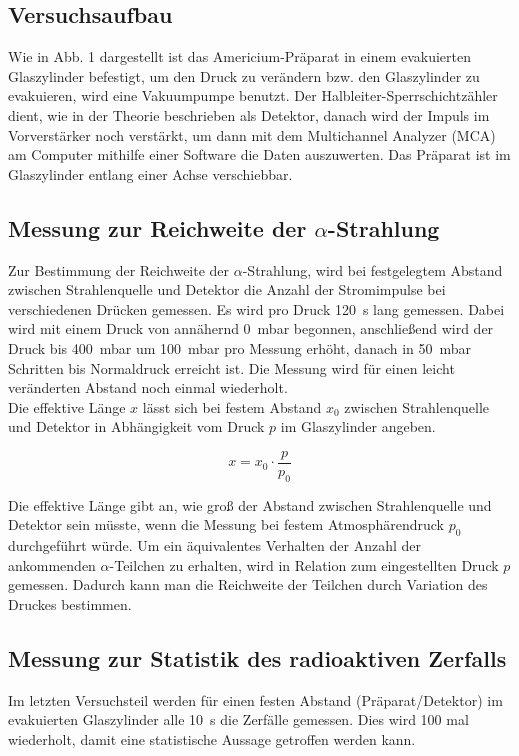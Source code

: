\subsection{Versuchsaufbau}
Wie in Abb. 1 dargestellt ist das Americium-Präparat in einem evakuierten Glaszylinder befestigt, um den Druck zu verändern bzw. den Glaszylinder zu evakuieren, wird eine Vakuumpumpe benutzt. Der Halbleiter-Sperrschichtzähler dient, wie in der Theorie beschrieben als Detektor, danach wird der Impuls im Vorverstärker noch verstärkt, um dann mit dem Multichannel Analyzer (MCA) am Computer mithilfe einer Software die Daten auszuwerten. Das Präparat ist im Glaszylinder entlang einer Achse verschiebbar.

\subsection{Messung zur Reichweite der $\alpha$-Strahlung}

Zur Bestimmung der Reichweite der $\alpha$-Strahlung, wird bei
festgelegtem Abstand zwischen Strahlenquelle und Detektor die Anzahl der Stromimpulse bei verschiedenen Drücken gemessen. Es wird pro Druck \SI{120}{\second} lang gemessen. Dabei wird mit einem
Druck von annähernd \SI{0}{\milli\bar} begonnen, anschließend wird der Druck bis \SI{400}{\milli\bar} um \SI{100}{\milli\bar} pro Messung erhöht, danach in \SI{50}{\milli\bar} Schritten bis Normaldruck erreicht ist. Die Messung wird für einen leicht veränderten Abstand noch einmal wiederholt.\\

Die effektive Länge $x$ lässt sich bei festem Abstand $x_0$ zwischen
Strahlenquelle und Detektor in Abhängigkeit vom Druck $p$ im Glaszylinder angeben.

\begin{equation}
  \label{eq:effektive_laenge}
  x = x_0 \cdot \frac{p}{p_0}
\end{equation}

Die effektive Länge gibt an, wie groß der Abstand zwischen Strahlenquelle und Detektor sein müsste, wenn die Messung bei festem Atmosphärendruck $p_0$ durchgeführt würde. Um ein äquivalentes Verhalten der Anzahl der ankommenden $\alpha$-Teilchen zu erhalten, wird in Relation zum eingestellten Druck $p$ gemessen. Dadurch kann man die Reichweite der Teilchen durch Variation des Druckes bestimmen.

\subsection{Messung zur Statistik des radioaktiven Zerfalls}
Im letzten Versuchsteil werden für einen festen Abstand (Präparat/Detektor) im evakuierten Glaszylinder alle \SI{10}{\second} die Zerfälle gemessen. Dies wird 100 mal wiederholt, damit eine statistische Aussage getroffen werden kann.

